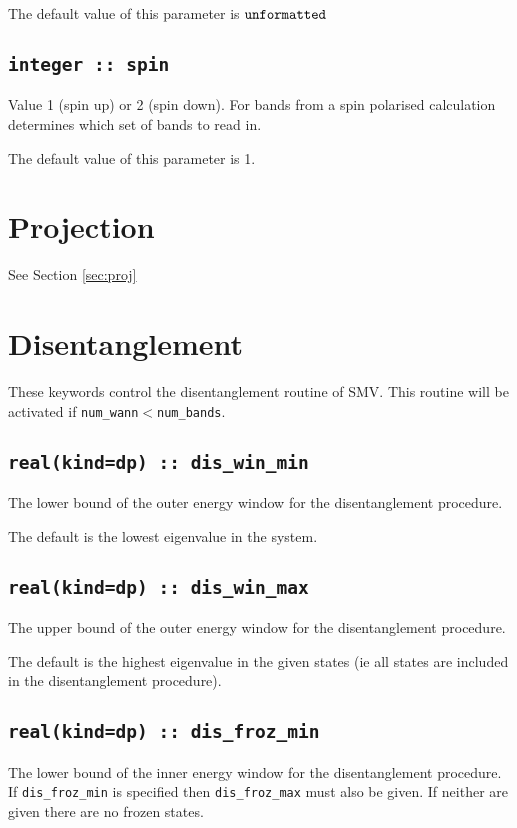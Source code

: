 The default value of this parameter is $\verb#unformatted#$


\subsection[spin]{\tt integer :: spin}
 Value 1 (spin up) or 2 (spin
down). For bands from a spin polarised calculation determines which set
of bands to read in.

The default value of this parameter is 1.





\section{Projection}

See Section \ref{sec:proj}



\section{Disentanglement}
These keywords control the disentanglement routine of SMV. This routine
will be activated if \verb#num_wann#$<$\verb#num_bands#.


\subsection[dis\_win\_min]{\tt real(kind=dp) :: dis\_win\_min}
The lower bound of the outer energy window for the disentanglement
procedure.

The default is the lowest eigenvalue in the system.

\subsection[dis\_win\_max]{\tt real(kind=dp) :: dis\_win\_max}
The upper bound of the outer energy window for the disentanglement
procedure.

The default is the highest eigenvalue in the given states (ie all states
are included in the disentanglement procedure).

\subsection[dis\_froz\_min]{\tt real(kind=dp) :: dis\_froz\_min}
The lower bound of the inner energy window for the disentanglement
procedure. If \verb#dis_froz_min# is specified then \verb#dis_froz_max#
must also be given. If neither are given there are no frozen states.


